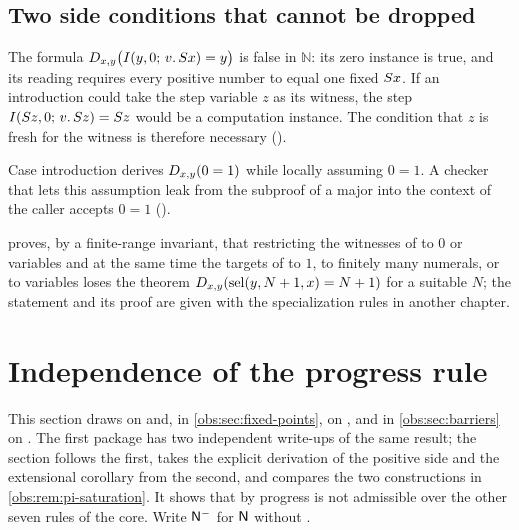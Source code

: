 \subsection{Two side conditions that cannot be dropped}

\begin{example}
\label{obs:ex:fresh}
The formula $D_{x,y}\bigl(I(y,0;\,v.\,S x)=y\bigr)$ is false in
$\mathbb{N}$: its zero instance is true, and its reading requires every
positive number to equal one fixed $S x$. If an introduction could take the
step variable $z$ as its witness, the step
$I(S z,0;\,v.\,S z)=S z$ would be a computation instance. The
condition that $z$ is fresh for the witness is therefore necessary
().
\end{example}

\begin{example}
\label{obs:ex:leak}
Case introduction derives $D_{x,y}(0=1)$ while locally assuming $0=1$. A
checker that lets this assumption leak from the subproof of a major into the
context of the caller accepts $0=1$ ().
\end{example}

 proves, by a finite-range invariant, that
restricting the witnesses of  to $0$ or variables and at the same
time the targets of  to $1$, to finitely many numerals, or to
variables loses the theorem $D_{x,y}(\operatorname{sel}(y,N+1,x)=N+1)$ for a suitable $N$;
the statement and its proof are given with the specialization rules in another
chapter.

\section{Independence of the progress rule}
\label{obs:sec:progress-independence}

This section draws on  and, in
\cref{obs:sec:fixed-points}, on , and in
\cref{obs:sec:barriers} on . The
first package has two independent write-ups of the same result; the section follows the first, takes
the explicit derivation of the positive side and the extensional corollary
from the second, and compares the two constructions in
\cref{obs:rem:pi-saturation}. It shows that
 by progress is not admissible over the other seven rules of the
core. Write $\mathsf{N}^{-}$ for $\mathsf{N}$ without .

